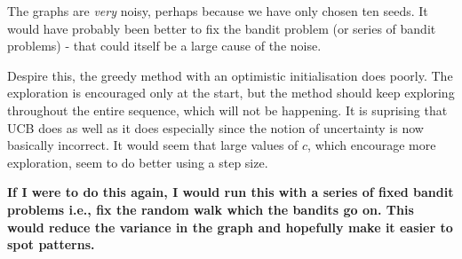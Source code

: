 \documentclass{article}
\begin{document}
The graphs are \emph{very} noisy, perhaps because we have only chosen ten seeds. It would have probably been better to fix the bandit problem (or series of bandit problems) - that could itself be a large cause of the noise. 

Despire this, the greedy method with an optimistic initialisation does poorly. The exploration is encouraged only at the start, but the method should keep exploring throughout the entire sequence, which will not be happening. It is suprising that UCB does as well as it does especially since the notion of uncertainty is now basically incorrect. It would seem that large values of $c$, which encourage more exploration, seem to do better using a step size. 

\textbf{If I were to do this again, I would run this with a series of fixed bandit problems i.e., fix the random walk which the bandits go on. This would reduce the variance in the graph and hopefully make it easier to spot patterns. } 
\end{document}
